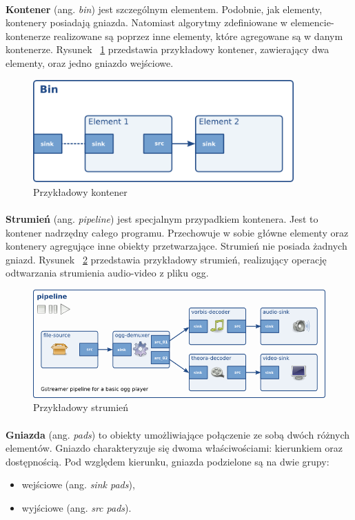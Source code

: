 \documentclass[12pt]{article}
\begin{document}
\paragraph{}
\textbf{Kontener} (ang. \textit{bin}) jest szczególnym elementem. Podobnie, jak elementy, kontenery posiadają gniazda. Natomiast algorytmy zdefiniowane w elemencie-kontenerze realizowane są poprzez inne elementy, które agregowane są w danym kontenerze. Rysunek ~\ref{fig:sampleBin} przedstawia przykładowy kontener, zawierający dwa elementy, oraz jedno gniazdo wejściowe.
\begin{figure}[H]
  \includegraphics[width=100mm]{img/sample-bin.png}
  \caption{Przykładowy kontener \cite{gstmainpage}}
  \label{fig:sampleBin}
\end{figure}
\paragraph{}
\textbf{Strumień} (ang. \textit{pipeline}) jest specjalnym przypadkiem kontenera. Jest to kontener nadrzędny całego programu. Przechowuje w sobie główne elementy oraz kontenery agregujące inne obiekty przetwarzające. Strumień nie posiada żadnych gniazd. Rysunek ~\ref{fig:samplePipeline} przedstawia przykładowy strumień, realizujący operację odtwarzania strumienia audio-video z pliku ogg.
\begin{figure}[H]
  \includegraphics[width=150mm]{img/simple-player.png}
  \caption{Przykładowy strumień \cite{gstmainpage}}
  \label{fig:samplePipeline}
\end{figure}
\paragraph{}
\textbf{Gniazda} (ang. \textit{pads}) to obiekty umożliwiające połączenie ze sobą dwóch różnych elementów. Gniazdo charakteryzuje się dwoma właściwościami: kierunkiem oraz dostępnością. Pod względem kierunku, gniazda podzielone są na dwie grupy:
\begin{itemize}
 \setlength{\itemsep}{0em}
  \item wejściowe (ang. \textit{sink pads}),
  \item wyjściowe (ang. \textit{src pads}).
\end{itemize}
\end{document}
